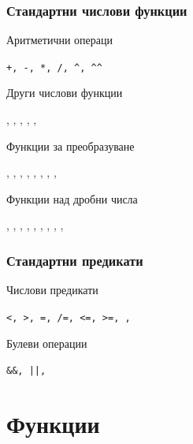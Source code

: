 \documentclass{beamer}
\begin{document}
\begin{frame}
  \frametitle{Стандартни числови функции}

  Аритметични операци

  \tt{+}, \tt{-}, \tt{*}, \tt{/}, \tt{\^{}}, \tt{\^{}\^{}}

  \vspace{1em}
  Други числови функции

  , , , , , 

  \vspace{1em}
  Функции за преобразуване

  , , , , , , , , 

  \vspace{1em}
  Функции над дробни числа

  , , , , , , , , , \lst{**}
\end{frame}

\begin{frame}
  \frametitle{Стандартни предикати}

  Числови предикати

  \tt{<}, \tt{>}, \tt{=}, \tt{/=}, \tt{<=}, \tt{>=}, , 

  \vspace{1em}
  Булеви операции

  \tt{\&\&}, \tt{||}, 
\end{frame}

\section{Функции}
\end{document}
